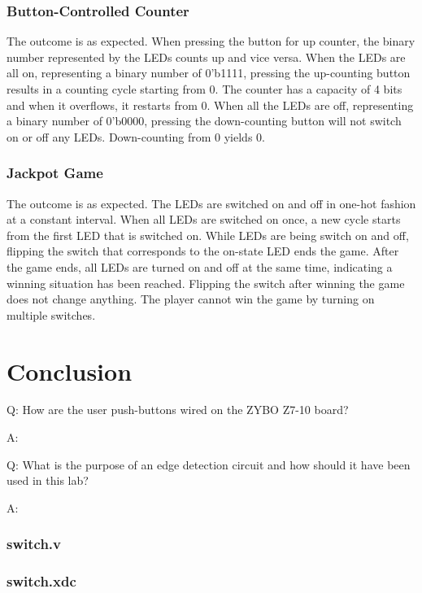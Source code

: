 \documentclass[11pt,letterpaper,titlepage]{article}
\begin{document}


\section{Button-Controlled Counter}



The outcome is as expected. When pressing the button for up counter, the binary number represented by the LEDs counts up and vice versa. When the LEDs are all on, representing a binary number of 0'b1111, pressing the up-counting button results in a counting cycle starting from 0. The counter has a capacity of 4 bits and when it overflows, it restarts from 0. When all the LEDs are off, representing a binary number of 0'b0000, pressing the down-counting button will not switch on or off any LEDs. Down-counting from 0 yields 0.

\section{Jackpot Game}


The outcome is as expected. The LEDs are switched on and off in one-hot fashion at a constant interval. When all LEDs are switched on once, a new cycle starts from the first LED that is switched on. While LEDs are being switch on and off, flipping the switch that corresponds to the on-state LED ends the game. After the game ends, all LEDs are turned on and off at the same time, indicating a winning situation has been reached. Flipping the switch after winning the game does not change anything. The player cannot win the game by turning on multiple switches.

\newpage

\part{Conclusion}

Q: How are the user push-buttons wired on the ZYBO Z7-10 board?

A:

Q: What is the purpose of an edge detection circuit and how should it have been used in this lab?

A:

\newpage

\begin{appendices}

\section{switch.v}
\label{appendix:verilog_switch}


\section{switch.xdc}
\label{appendix:xdc_switch}


\end{appendices} 
\end{document}
